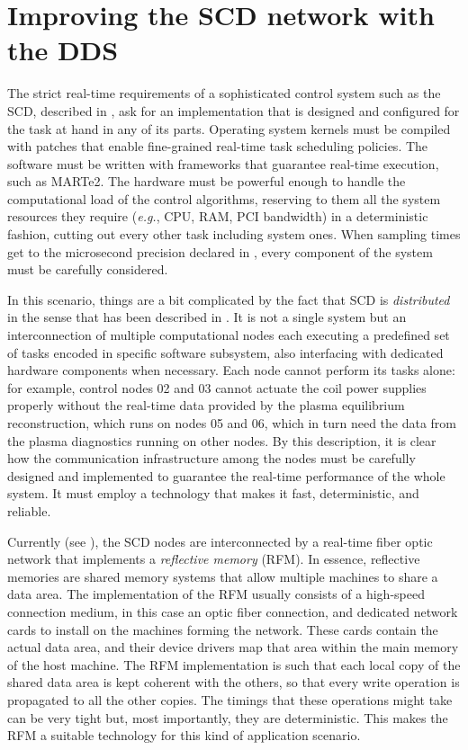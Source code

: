 \section{Improving the SCD network with the DDS}
\label{sec:ddstcv}
The strict real-time requirements of a sophisticated control system such as the SCD, described in , ask for an implementation that is designed and configured for the task at hand in any of its parts. Operating system kernels must be compiled with patches that enable fine-grained real-time task scheduling policies. The software must be written with frameworks that guarantee real-time execution, such as MARTe2. The hardware must be powerful enough to handle the computational load of the control algorithms, reserving to them all the system resources they require (\emph{e.g.}, CPU, RAM, PCI bandwidth) in a deterministic fashion, cutting out every other task including system ones. When sampling times get to the microsecond precision declared in , every component of the system must be carefully considered.

In this scenario, things are a bit complicated by the fact that SCD is \emph{distributed} in the sense that has been described in . It is not a single system but an interconnection of multiple computational nodes each executing a predefined set of tasks encoded in specific software subsystem, also interfacing with dedicated hardware components when necessary. Each node cannot perform its tasks alone: for example, control nodes 02 and 03 cannot actuate the coil power supplies properly without the real-time data provided by the plasma equilibrium reconstruction, which runs on nodes 05 and 06, which in turn need the data from the plasma diagnostics running on other nodes. By this description, it is clear how the communication infrastructure among the nodes must be carefully designed and implemented to guarantee the real-time performance of the whole system. It must employ a technology that makes it fast, deterministic, and reliable.

Currently (see \cite{galperti_overview_2024}), the SCD nodes are interconnected by a real-time fiber optic network that implements a \emph{reflective memory} (RFM). In essence, reflective memories are shared memory systems that allow multiple machines to share a data area. The implementation of the RFM usually consists of a high-speed connection medium, in this case an optic fiber connection, and dedicated network cards to install on the machines forming the network. These cards contain the actual data area, and their device drivers map that area within the main memory of the host machine. The RFM implementation is such that each local copy of the shared data area is kept coherent with the others, so that every write operation is propagated to all the other copies. The timings that these operations might take can be very tight but, most importantly, they are deterministic. This makes the RFM a suitable technology for this kind of application scenario.

